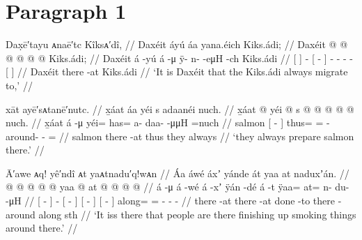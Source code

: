 \clearpage
\section{Paragraph 1}\label{sec:099-para-1}

\ex\label{ex:099-1-migrate-to-daxeit}%
%
\begingl
	\glpreamble	Dax̣ē′tayu ᴀnaē′tc Kîksᴀ′dî, //
	\glpreamble	Daxéit áyú áa yana.éich Kiks.ádi; //
	\gla	{} Daxéit {}  @ {}
		{}  @ {} {}
		 @ {} @ {} @ {} @ {}
		{} Kiks.ádi; {} //
	\glb	{} Daxéit {} á -yú
		{} á -μ {}
		ÿ- n-  -eμH -ch
		{} Kiks.ádi {} //
	\glc	{}[  {}]  -
		{}[  - {}]
		- -  - -
		{}[  {}] //
	\gld	{} Daxéit {}  {}
		{} there -at {}
		 {} {} {} {}
		{} Kiks.ádi {} //
	\glft	‘It is Daxéit that the Kiks.ádi always migrate to,’
		//
\endgl
\xe

\ex\label{ex:099-2-prepare-fish}%
%
\begingl
	\glpreamble	xāt ayē′sᴀtanē′nutc. //
	\glpreamble	x̱áat áa yéi s adaanéi nuch. //
	\gla	x̱áat {}  @ {} {}
		yéi @ s @  @ {} @ {} @ {} @ \•nuch. //
	\glb	x̱áat {} á -μ {}
		yéi= has= a- daa-  -μμH =nuch //
	\glc	salmon {}[  - {}]
		thus= = - around-  - = //
	\gld	salmon {} there -at {}
		thus they  {} {} {} \•always //
	\glft	‘they always prepare salmon there.’
		//
\endgl
\xe

\ex\label{ex:099-3-finish-smoking}%
%
\begingl
	\glpreamble	Ā′awe ᴀq! yê′ndî ᴀt yaᴀtnadu′q!wᴀn //
	\glpreamble	Áa áwé áxʼ yánde át yaa at naduxʼán. //
	\gla	{}  @ {} {}  @ {}
		{}  @ {} {}
		{}  @ {} {}
		{}  @ {} {}
		yaa @ at @  @ {} @ {} @ {} //
	\glb	{} á -μ {} á -wé
		{} á -xʼ {}
		{} ÿán -dé {}
		{} á -t {}
		ÿaa= at= n- du-  -μH //
	\glc	{}[  - {}]  -
		{}[  - {}]
		{}[  - {}]
		{}[  - {}]
		along= = - -  - //
	\gld	{} there -at {}  {}
		{} there -at {}
		{} done -to {}
		{} there -around {}
		along sth  {} {} {} //
	\glft	‘It iss there that people are there finishing up smoking things around there.’
		//
\endgl
\xe

